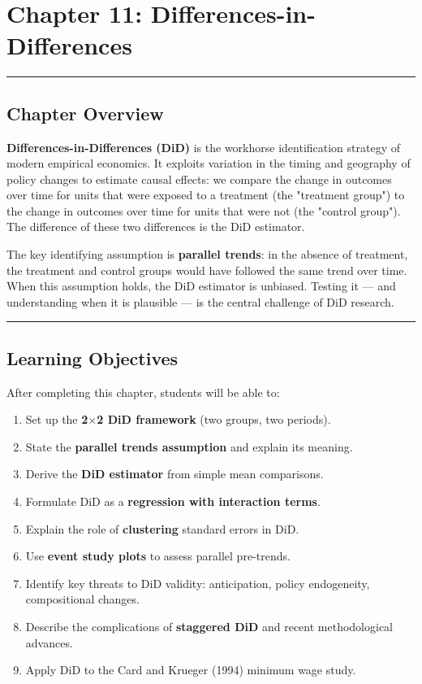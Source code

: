 \chapter{Chapter 11: Differences-in-Differences}

\medskip\hrule\medskip

\section{Chapter Overview}

\textbf{Differences-in-Differences (DiD)} is the workhorse identification strategy of modern empirical economics. It exploits variation in the timing and geography of policy changes to estimate causal effects: we compare the change in outcomes over time for units that were exposed to a treatment (the "treatment group") to the change in outcomes over time for units that were not (the "control group"). The difference of these two differences is the DiD estimator.

The key identifying assumption is \textbf{parallel trends}: in the absence of treatment, the treatment and control groups would have followed the same trend over time. When this assumption holds, the DiD estimator is unbiased. Testing it --- and understanding when it is plausible --- is the central challenge of DiD research.

\medskip\hrule\medskip

\section{Learning Objectives}

After completing this chapter, students will be able to:

\begin{enumerate}
\item Set up the \textbf{2$\times$2 DiD framework} (two groups, two periods).
\item State the \textbf{parallel trends assumption} and explain its meaning.
\item Derive the \textbf{DiD estimator} from simple mean comparisons.
\item Formulate DiD as a \textbf{regression with interaction terms}.
\item Explain the role of \textbf{clustering} standard errors in DiD.
\item Use \textbf{event study plots} to assess parallel pre-trends.
\item Identify key threats to DiD validity: anticipation, policy endogeneity, compositional changes.
\item Describe the complications of \textbf{staggered DiD} and recent methodological advances.
\item Apply DiD to the Card and Krueger (1994) minimum wage study.
\end{enumerate}

